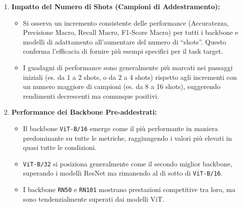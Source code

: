 \documentclass[11pt,a4paper]{article}
\begin{document}
\begin{enumerate}
    \item \textbf{Impatto del Numero di Shots (Campioni di Addestramento):}
    \begin{itemize}[label=\textbullet, leftmargin=*]
        \item Si osserva un incremento consistente delle performance (Accuratezza, Precisione Macro, Recall Macro, F1-Score Macro) per tutti i backbone e modelli di adattamento all'aumentare del numero di ``shots''. Questo conferma l'efficacia di fornire più esempi specifici per il task target.
        \item I guadagni di performance sono generalmente più marcati nei passaggi iniziali (es. da 1 a 2 shots, o da 2 a 4 shots) rispetto agli incrementi con un numero maggiore di campioni (es. da 8 a 16 shots), suggerendo rendimenti decrescenti ma comunque positivi.
    \end{itemize}

    \item \textbf{Performance dei Backbone Pre-addestrati:}
    \begin{itemize}[label=\textbullet, leftmargin=*]
        \item Il backbone \texttt{ViT-B/16} emerge come il più performante in maniera predominante su tutte le metriche, raggiungendo i valori più elevati in quasi tutte le condizioni.
        \item \texttt{ViT-B/32} si posiziona generalmente come il secondo miglior backbone, superando i modelli ResNet ma rimanendo al di sotto di \texttt{ViT-B/16}.
        \item I backbone \texttt{RN50} e \texttt{RN101} mostrano prestazioni competitive tra loro, ma sono tendenzialmente superati dai modelli ViT.
    \end{itemize}


\end{enumerate}
\end{document}
